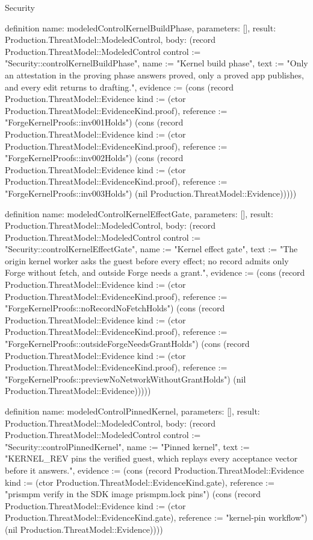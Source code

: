 \begin{lexlean}{Security}
\begin{semanticmodule}
definition{
  name: modeledControlKernelBuildPhase,
  parameters: [],
  result: Production.ThreatModel::ModeledControl,
  body: (record Production.ThreatModel::ModeledControl {control := "Security::controlKernelBuildPhase", name := "Kernel build phase", text := "Only an attestation in the proving phase answers proved, only a proved app publishes, and every edit returns to drafting.", evidence := (cons (record Production.ThreatModel::Evidence {kind := (ctor Production.ThreatModel::EvidenceKind.proof), reference := "ForgeKernelProofs::inv001Holds"}) (cons (record Production.ThreatModel::Evidence {kind := (ctor Production.ThreatModel::EvidenceKind.proof), reference := "ForgeKernelProofs::inv002Holds"}) (cons (record Production.ThreatModel::Evidence {kind := (ctor Production.ThreatModel::EvidenceKind.proof), reference := "ForgeKernelProofs::inv003Holds"}) (nil Production.ThreatModel::Evidence))))})
}

definition{
  name: modeledControlKernelEffectGate,
  parameters: [],
  result: Production.ThreatModel::ModeledControl,
  body: (record Production.ThreatModel::ModeledControl {control := "Security::controlKernelEffectGate", name := "Kernel effect gate", text := "The origin kernel worker asks the guest before every effect; no record admits only Forge without fetch, and outside Forge needs a grant.", evidence := (cons (record Production.ThreatModel::Evidence {kind := (ctor Production.ThreatModel::EvidenceKind.proof), reference := "ForgeKernelProofs::noRecordNoFetchHolds"}) (cons (record Production.ThreatModel::Evidence {kind := (ctor Production.ThreatModel::EvidenceKind.proof), reference := "ForgeKernelProofs::outsideForgeNeedsGrantHolds"}) (cons (record Production.ThreatModel::Evidence {kind := (ctor Production.ThreatModel::EvidenceKind.proof), reference := "ForgeKernelProofs::previewNoNetworkWithoutGrantHolds"}) (nil Production.ThreatModel::Evidence))))})
}

definition{
  name: modeledControlPinnedKernel,
  parameters: [],
  result: Production.ThreatModel::ModeledControl,
  body: (record Production.ThreatModel::ModeledControl {control := "Security::controlPinnedKernel", name := "Pinned kernel", text := "KERNEL_REV pins the verified guest, which replays every acceptance vector before it answers.", evidence := (cons (record Production.ThreatModel::Evidence {kind := (ctor Production.ThreatModel::EvidenceKind.gate), reference := "prismpm verify in the SDK image prismpm.lock pins"}) (cons (record Production.ThreatModel::Evidence {kind := (ctor Production.ThreatModel::EvidenceKind.gate), reference := "kernel-pin workflow"}) (nil Production.ThreatModel::Evidence)))})
}


\end{semanticmodule}
\end{lexlean}
